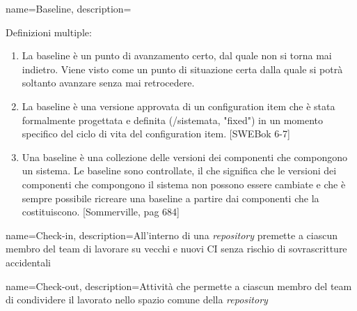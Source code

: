 {
name=Baseline,
description={Definizioni multiple:
\begin{enumerate}
\item La baseline è un punto di avanzamento certo, dal quale non si torna mai indietro. Viene visto come un punto di situazione certa dalla quale si potrà soltanto avanzare senza mai retrocedere.
\item La baseline è una versione approvata di un configuration item che è stata formalmente progettata e definita (/sistemata, "fixed") in un momento specifico del ciclo di vita del configuration item. [SWEBok 6-7]
\item Una baseline è una collezione delle versioni dei componenti che compongono un sistema. Le baseline sono controllate, il che significa che le versioni dei componenti che compongono il sistema non possono essere cambiate e che è sempre possibile ricreare una baseline a partire dai componenti che la costituiscono. [Sommerville, pag 684]
\end{enumerate} }
}
{
  name=Check-in,
  description={All'interno di una \textit{repository} premette a ciascun membro del team di lavorare su vecchi e nuovi CI senza rischio di sovrascritture accidentali}
}

{
  name=Check-out,
  description={Attività che permette a ciascun membro del team di condividere il lavorato nello spazio comune della \textit{repository}}
}



